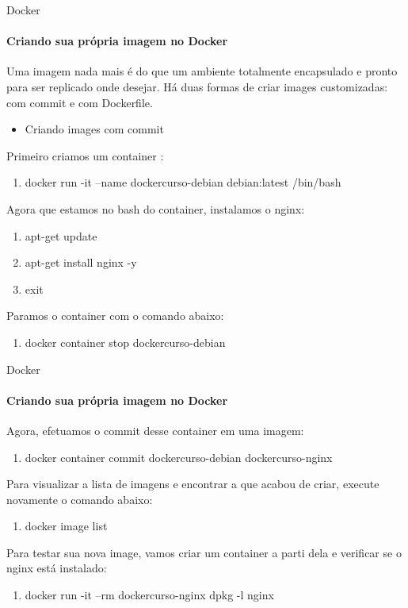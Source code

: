 \documentclass{beamer}
\begin{document}
\begin{frame}{Docker}
    \framesubtitle{Criando sua pr\'opria imagem no Docker}
    Uma imagem nada mais \'e do que um ambiente totalmente encapsulado e pronto para ser replicado onde desejar.
    Há duas formas de criar images customizadas: com commit e com Dockerfile.
    \begin{itemize}
        \item Criando images com commit
    \end{itemize}
    Primeiro criamos um container :
    \begin{enumerate}
        \item docker run -it --name dockercurso-debian debian:latest /bin/bash
    \end{enumerate} 
    Agora que estamos no bash do container, instalamos o nginx:
    \begin{enumerate}
        \item apt-get update
        \item apt-get install nginx -y
        \item exit
    \end{enumerate}
    Paramos o container com o comando abaixo:
    \begin{enumerate}
        \item docker container stop dockercurso-debian 
    \end{enumerate}
\end{frame}

\begin{frame}{Docker}
    \framesubtitle{Criando sua pr\'opria imagem no Docker}
    Agora, efetuamos o commit desse container em uma imagem:
    \begin{enumerate}
        \item docker container commit dockercurso-debian dockercurso-nginx
    \end{enumerate}
    Para visualizar a lista de imagens e encontrar a que acabou de criar,
    execute novamente o comando abaixo:
    \begin{enumerate}
        \item docker image list
    \end{enumerate}
    Para testar sua nova image, vamos criar um container a parti dela e verificar se o nginx está instalado:
    \begin{enumerate}
        \item docker run -it --rm dockercurso-nginx dpkg -l nginx
    \end{enumerate}
\end{frame}
\end{document}
